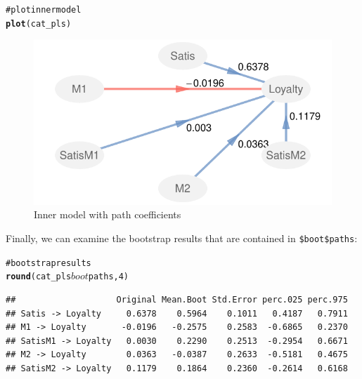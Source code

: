 \documentclass[12pt]{book}\usepackage{graphicx, color}
\makeatletter
\newcommand{\hlfunctioncall}[1]{\textcolor[rgb]{0.501960784313725,0,0.329411764705882}{\textbf{#1}}}%
\newcommand{\hlcomment}[1]{\textcolor[rgb]{0.180392156862745,0.6,0.341176470588235}{#1}}%
\newenvironment{kframe}{%
 \def\at@end@of@kframe{}%
 \ifinner\ifhmode%
  \def\at@end@of@kframe{\end{minipage}}%
  \begin{minipage}{\columnwidth}%
 \fi\fi%
 \def\FrameCommand##1{\hskip\@totalleftmargin \hskip-\fboxsep
 \colorbox{shadecolor}{##1}\hskip-\fboxsep
     \hskip-\linewidth \hskip-\@totalleftmargin \hskip\columnwidth}%
 \MakeFramed {\advance\hsize-\width
   \@totalleftmargin\z@ \linewidth\hsize
   \@setminipage}}%
 {\par\unskip\endMakeFramed%
 \at@end@of@kframe}
\newenvironment{knitrout}{}{} %
\newcommand{\code}[1]{\texttt{#1}}
\makeatother
\begin{document}
\begin{knitrout}
\color{fgcolor}\begin{kframe}
\begin{alltt}
\hlcomment{# plot inner model}
\hlfunctioncall{plot}(cat_pls)
\end{alltt}
\end{kframe}\begin{figure}[h]


{\centering \includegraphics[width=.6\linewidth,height=.4\linewidth]{figure/CatVarApp_plot_inner} 

}

\caption[Inner model with path coefficients]{Inner model with path coefficients\label{fig:CatVarApp_plot_inner}}
\end{figure}


\end{knitrout}


Finally, we can examine the  bootstrap results that are contained in \code{\$boot\$paths}:
\begin{knitrout}
\color{fgcolor}\begin{kframe}
\begin{alltt}
\hlcomment{# bootstrap results}
\hlfunctioncall{round}(cat_pls$boot$paths, 4)
\end{alltt}
\begin{verbatim}
##                    Original Mean.Boot Std.Error perc.025 perc.975
## Satis -> Loyalty     0.6378    0.5964    0.1011   0.4187   0.7911
## M1 -> Loyalty       -0.0196   -0.2575    0.2583  -0.6865   0.2370
## SatisM1 -> Loyalty   0.0030    0.2290    0.2513  -0.2954   0.6671
## M2 -> Loyalty        0.0363   -0.0387    0.2633  -0.5181   0.4675
## SatisM2 -> Loyalty   0.1179    0.1864    0.2360  -0.2614   0.6168
\end{verbatim}
\end{kframe}
\end{knitrout}
\end{document}
